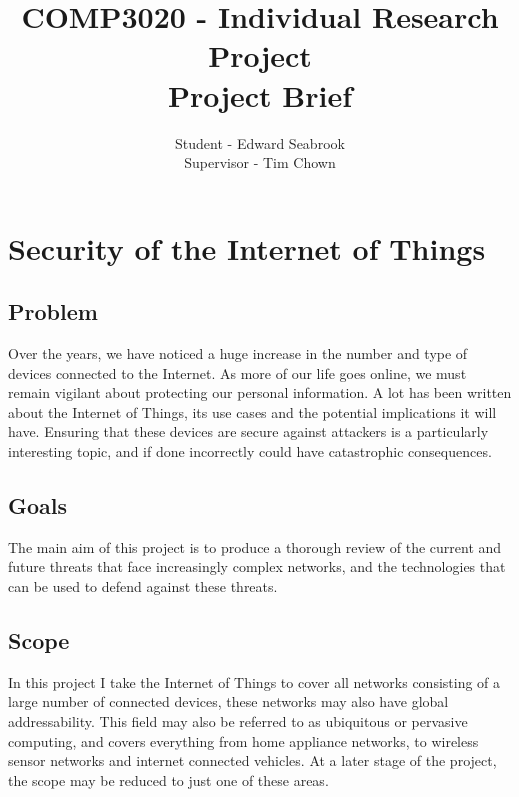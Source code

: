 \documentclass[11pt]{article} %
\title{COMP3020 - Individual Research Project \\ Project Brief
}
\author{Student - Edward Seabrook \\ Supervisor - Tim Chown}
\date{}
\begin{document}
\maketitle

\section*{Security of the Internet of Things}

\subsection*{Problem}
Over the years, we have noticed a huge increase in the number and type of
devices connected to the Internet. As more of our life goes online, we must
remain vigilant about protecting our personal information. A lot has been
written about the Internet of Things, its use cases and the potential
implications it will have. Ensuring that these devices are secure against
attackers is a particularly interesting topic, and if done incorrectly could
have catastrophic consequences. 

\subsection*{Goals}
The main aim of this project is to produce a thorough review of the current and
future threats that face increasingly complex networks, and the technologies
that can be used to defend against these threats. 

\subsection*{Scope}
In this project I take the Internet of Things to cover all networks consisting
of a large number of connected devices, these networks may also have global
addressability. This field may also be referred to as ubiquitous or pervasive
computing, and covers everything from home appliance networks, to wireless
sensor networks and internet connected vehicles. At a later stage of the
project, the scope may be reduced to just one of these areas.  
\end{document}
